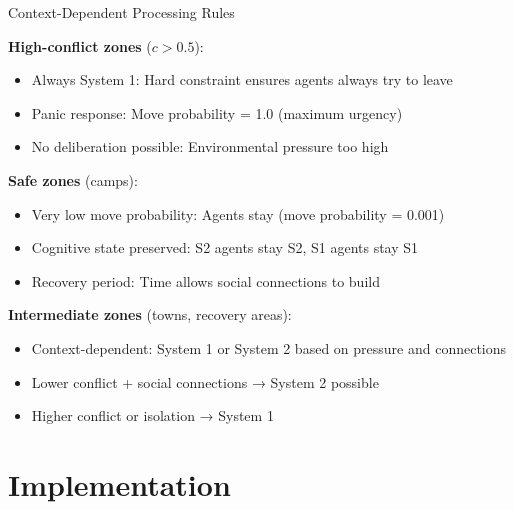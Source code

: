 \documentclass[aspectratio=169]{beamer}
\begin{document}
\begin{frame}{Context-Dependent Processing Rules}

\textbf{High-conflict zones} ($c > 0.5$):
\begin{itemize}
    \item \alert{Always System 1}: Hard constraint ensures agents always try to leave
    \item Panic response: Move probability = 1.0 (maximum urgency)
    \item No deliberation possible: Environmental pressure too high
\end{itemize}

\vspace{0.5em}

\textbf{Safe zones} (camps):
\begin{itemize}
    \item \alert{Very low move probability}: Agents stay (move probability = 0.001)
    \item Cognitive state preserved: S2 agents stay S2, S1 agents stay S1
    \item Recovery period: Time allows social connections to build
\end{itemize}

\vspace{0.5em}

\textbf{Intermediate zones} (towns, recovery areas):
\begin{itemize}
    \item \alert{Context-dependent}: System 1 or System 2 based on pressure and connections
    \item Lower conflict + social connections → System 2 possible
    \item Higher conflict or isolation → System 1
\end{itemize}

\end{frame}

\section{Implementation}
\end{document}
